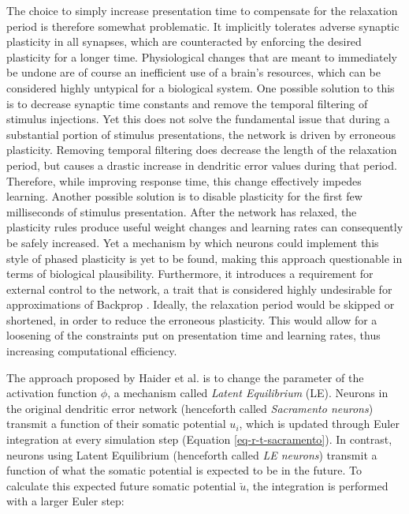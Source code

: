 The choice to simply increase presentation time to compensate for the relaxation period is therefore somewhat
problematic. It implicitly tolerates adverse synaptic plasticity in all synapses, which are counteracted by enforcing
the desired plasticity for a longer time. Physiological changes that are meant to immediately be undone are of course an
inefficient use of a brain's resources, which can be considered highly untypical for a biological system. One possible
solution to this is to decrease synaptic time constants and remove the temporal filtering of stimulus injections. Yet
this does not solve the fundamental issue that during a substantial portion of stimulus presentations, the network is
driven by erroneous plasticity. Removing temporal filtering does decrease the length of the relaxation period, but
causes a drastic increase in dendritic error values during that period. Therefore, while improving response time, this
change effectively impedes learning. Another possible solution is to disable plasticity for the first few milliseconds
of stimulus presentation. After the network has relaxed, the plasticity rules produce useful weight changes and learning
rates can consequently be safely increased. Yet a mechanism by which neurons could implement this style of phased
plasticity is yet to be found, making this approach questionable in terms of biological plausibility. Furthermore, it
introduces a requirement for external control to the network, a trait that is considered highly undesirable for
approximations of Backprop \citep{whittington2019theories}. Ideally, the relaxation period would be skipped or
shortened, in order to reduce the erroneous plasticity. This would allow for a loosening of the constraints put on
presentation time and learning rates, thus increasing computational efficiency. \newline



The approach proposed by Haider et al. is to change the parameter of the activation function $\phi$, a mechanism called
\textit{Latent Equilibrium} (LE). Neurons in the original dendritic error network (henceforth called \textit{Sacramento
neurons}) transmit a function of their somatic potential $u_i$, which is updated through Euler integration at every
simulation step (Equation \ref{eq-r-t-sacramento}). In contrast, neurons using Latent Equilibrium (henceforth called
\textit{LE neurons}) transmit a function of what the somatic potential is expected to be in the future. To calculate
this expected future somatic potential $\breve{u}$, the integration is performed with a larger Euler step:

